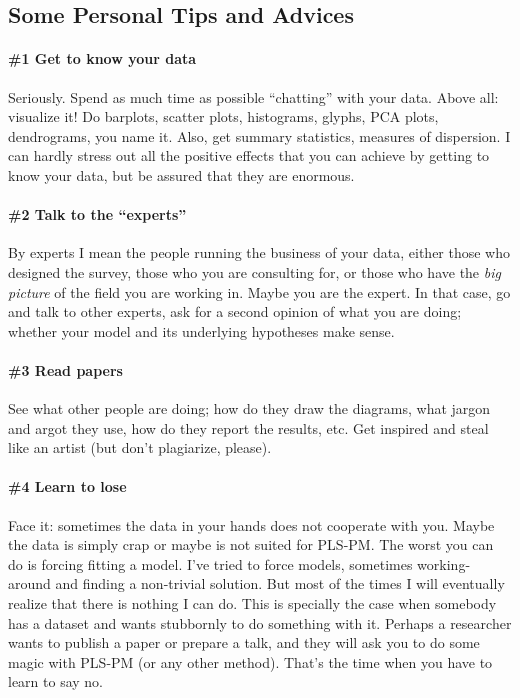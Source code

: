 \documentclass[12pt]{book}\usepackage{graphicx, color}
\begin{document}
\subsection*{Some Personal Tips and Advices}

\paragraph{\#1 Get to know your data}
Seriously. Spend as much time as possible ``chatting'' with your data. Above all: visualize it! Do barplots, scatter plots, histograms, glyphs, PCA plots, dendrograms, you name it. Also, get summary statistics, measures of dispersion. I can hardly stress out all the positive effects that you can achieve by getting to know your data, but be assured that they are enormous.

\paragraph{\#2 Talk to the ``experts''}
By experts I mean the people running the business of your data, either those who designed the survey, those who you are consulting for, or those who have the \textit{big picture} of the field you are working in. Maybe you are the expert. In that case, go and talk to other experts, ask for a second opinion of what you are doing; whether your model and its underlying hypotheses make sense.

\paragraph{\#3 Read papers}
See what other people are doing; how do they draw the diagrams, what jargon and argot they use, how do they report the results, etc. Get inspired and steal like an artist (but don't plagiarize, please).

\paragraph{\#4 Learn to lose}
Face it: sometimes the data in your hands does not cooperate with you. Maybe the data is simply crap or maybe is not suited for PLS-PM. The worst you can do is forcing fitting a model. I've tried to force models, sometimes working-around and finding a non-trivial solution. But most of the times I will eventually realize that there is nothing I can do. This is specially the case when somebody has a dataset and wants stubbornly to do something with it. Perhaps a researcher wants to publish a paper or prepare a talk, and they will ask you to do some magic with PLS-PM (or any other method). That's the time when you have to learn to say no.
\end{document}
